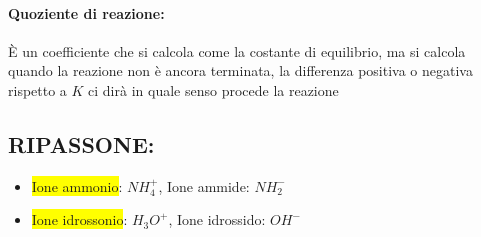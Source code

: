 \documentclass{article}
\begin{document}
\paragraph{Quoziente di reazione:} È un coefficiente che si calcola come la costante di equilibrio, ma si calcola quando la reazione non è ancora terminata, la differenza positiva o negativa rispetto a $K$ ci dirà in quale senso procede la reazione 

\newpage
\subsection{RIPASSONE: }

\begin{itemize}
	\item \colorbox{yellow}{Ione ammonio}: $NH_4^+$, Ione ammide: $NH_2^-$
	\item \colorbox{yellow}{Ione idrossonio}: $H_3O^+$, Ione idrossido: $OH^-$
\end{itemize}
\end{document}
